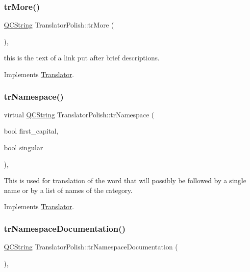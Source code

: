 \subsubsection{\texorpdfstring{trMore()}{trMore()}}
{\footnotesize\ttfamily \mbox{\hyperlink{class_q_c_string}{Q\+C\+String}} Translator\+Polish\+::tr\+More (\begin{DoxyParamCaption}{ }\end{DoxyParamCaption})\hspace{0.3cm}{\ttfamily [inline]}, {\ttfamily [virtual]}}

this is the text of a link put after brief descriptions. 

Implements \mbox{\hyperlink{class_translator}{Translator}}.

\mbox{\label{class_translator_polish_ab1170336b09d8143cc0391cf2f66de6e}} 
\subsubsection{\texorpdfstring{trNamespace()}{trNamespace()}}
{\footnotesize\ttfamily virtual \mbox{\hyperlink{class_q_c_string}{Q\+C\+String}} Translator\+Polish\+::tr\+Namespace (\begin{DoxyParamCaption}\item[{bool}]{first\+\_\+capital,  }\item[{bool}]{singular }\end{DoxyParamCaption})\hspace{0.3cm}{\ttfamily [inline]}, {\ttfamily [virtual]}}

This is used for translation of the word that will possibly be followed by a single name or by a list of names of the category. 

Implements \mbox{\hyperlink{class_translator}{Translator}}.

\mbox{\label{class_translator_polish_a841e96dec3b0c1f25eb120cfec6acba3}} 
\subsubsection{\texorpdfstring{trNamespaceDocumentation()}{trNamespaceDocumentation()}}
{\footnotesize\ttfamily \mbox{\hyperlink{class_q_c_string}{Q\+C\+String}} Translator\+Polish\+::tr\+Namespace\+Documentation (\begin{DoxyParamCaption}{ }\end{DoxyParamCaption})\hspace{0.3cm}{\ttfamily [inline]}, {\ttfamily [virtual]}}

